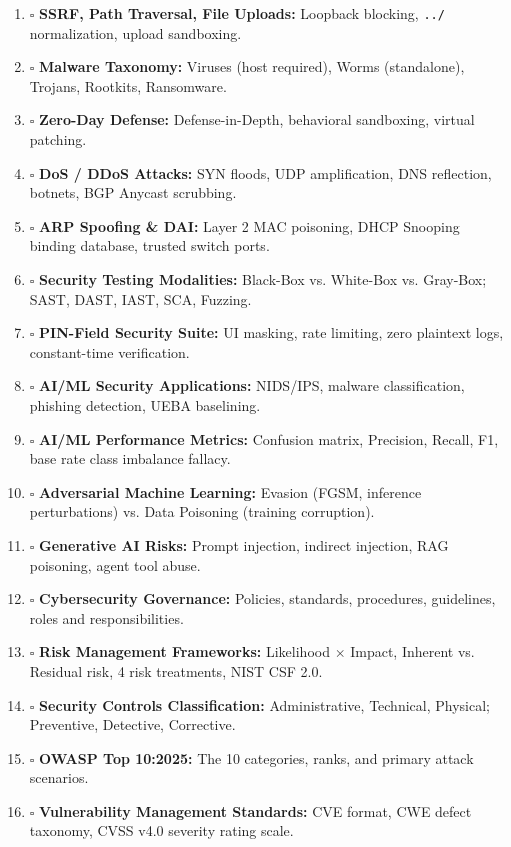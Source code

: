 \begin{enumerate}
\item $\square$ \textbf{SSRF, Path Traversal, File Uploads:} Loopback blocking, \texttt{../} normalization, upload sandboxing.
\item $\square$ \textbf{Malware Taxonomy:} Viruses (host required), Worms (standalone), Trojans, Rootkits, Ransomware.
\item $\square$ \textbf{Zero-Day Defense:} Defense-in-Depth, behavioral sandboxing, virtual patching.
\item $\square$ \textbf{DoS / DDoS Attacks:} SYN floods, UDP amplification, DNS reflection, botnets, BGP Anycast scrubbing.
\item $\square$ \textbf{ARP Spoofing \& DAI:} Layer 2 MAC poisoning, DHCP Snooping binding database, trusted switch ports.
\item $\square$ \textbf{Security Testing Modalities:} Black-Box vs. White-Box vs. Gray-Box; SAST, DAST, IAST, SCA, Fuzzing.
\item $\square$ \textbf{PIN-Field Security Suite:} UI masking, rate limiting, zero plaintext logs, constant-time verification.
\item $\square$ \textbf{AI/ML Security Applications:} NIDS/IPS, malware classification, phishing detection, UEBA baselining.
\item $\square$ \textbf{AI/ML Performance Metrics:} Confusion matrix, Precision, Recall, F1, base rate class imbalance fallacy.
\item $\square$ \textbf{Adversarial Machine Learning:} Evasion (FGSM, inference perturbations) vs. Data Poisoning (training corruption).
\item $\square$ \textbf{Generative AI Risks:} Prompt injection, indirect injection, RAG poisoning, agent tool abuse.
\item $\square$ \textbf{Cybersecurity Governance:} Policies, standards, procedures, guidelines, roles and responsibilities.
\item $\square$ \textbf{Risk Management Frameworks:} Likelihood $\times$ Impact, Inherent vs. Residual risk, 4 risk treatments, NIST CSF 2.0.
\item $\square$ \textbf{Security Controls Classification:} Administrative, Technical, Physical; Preventive, Detective, Corrective.
\item $\square$ \textbf{OWASP Top 10:2025:} The 10 categories, ranks, and primary attack scenarios.
\item $\square$ \textbf{Vulnerability Management Standards:} CVE format, CWE defect taxonomy, CVSS v4.0 severity rating scale.

\end{enumerate}
